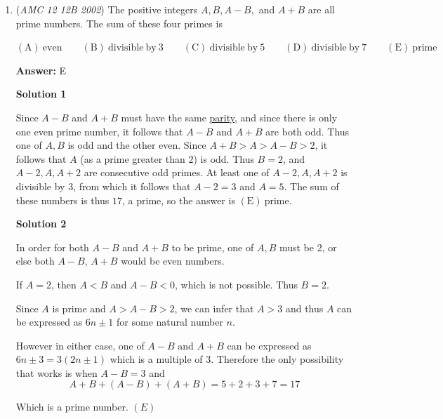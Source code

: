 \begin{enumerate}
 On similar lines, it can be found that the sums are arithmetic progressions (the least being 12 and the greatest being 48). By applying the formula, we get that there are 13 terms in the sequence of sums, which is our answer.

 


	\item (\textit{AMC 12 12B 2002}) The positive integers $A, B, A-B,$ and $A+B$ are all prime numbers. The sum of these four primes is


 $\mathrm{(A)}\ \mathrm{even} \qquad\mathrm{(B)}\ \mathrm{divisible\ by\ }3 \qquad\mathrm{(C)}\ \mathrm{divisible\ by\ }5 \qquad\mathrm{(D)}\ \mathrm{divisible\ by\ }7 \qquad\mathrm{(E)}\ \mathrm{prime}$

 \textbf{Answer: }E



\textbf{Solution 1}

Since $A-B$ and $A+B$ must have the same \href{https://artofproblemsolving.com/wiki/index.php?title=Parity}{parity}, and since there is only one even prime number, it follows that $A-B$ and $A+B$ are both odd. Thus one of $A, B$ is odd and the other even. Since $A+B > A > A-B > 2$, it follows that $A$ (as a prime greater than $2$) is odd. Thus $B = 2$, and $A-2, A, A+2$ are consecutive odd primes. At least one of $A-2, A, A+2$ is divisible by $3$, from which it follows that $A-2 = 3$ and $A = 5$. The sum of these numbers is thus $17$, a prime, so the answer is $\boxed{\mathrm{(E)}\ \text{prime}}$.

 



\textbf{Solution 2}

In order for both $A - B$ and $A + B$ to be prime, one of $A, B$ must be 2, or else both $A - B$, $A + B$ would be even numbers. 

 If $A = 2$, then $A < B$ and $A - B < 0$, which is not possible. Thus $B = 2$.

 Since $A$ is prime and $A > A - B > 2$, we can infer that $A > 3$ and thus $A$ can be expressed as $6n \pm 1$ for some natural number $n$. 

 However in either case, one of $A - B$ and $A + B$ can be expressed as $6n \pm 3 = 3(2n \pm 1)$ which is a multiple of 3. Therefore the only possibility that works is when $A - B = 3$ and 
 \[A + B + (A - B) + (A + B) = 5 + 2 + 3 + 7 = 17\]

 Which is a prime number. $\boxed{(E)}$





\end{enumerate}
